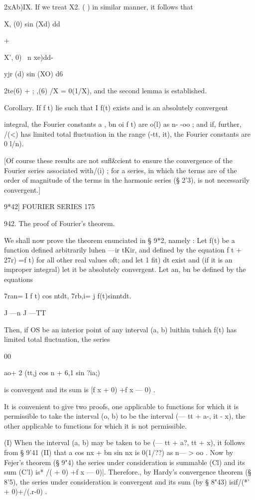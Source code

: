  2xAb)IX. If we treat X2. ( ) in similar manner, it follows that



X, (0) sin (Xd) dd



+



X', 0) \ n xe)dd-



yjr (d) sin (XO) d6

 2te(6) + ; ,(6) /X = 0(1/X), and the second lemma is established.

Corollary. If f t) lie such that I f(t) exists and is an absolutely
convergent

integral, the Fourier constants a , bn oi f t) are o(l) as n- -oo ;
and if, further, /(<) has limited total fluctuation in the range (-tt,
it), the Fourier constants are 0 l/n).

[Of course these results are not sufl\&cient to ensure the convergence
of the Fourier series associated with/(i) ; for a series, in which the
terms are of the order of magnitude of the terms in the harmonic
series (§ 2'3), is not necessarily convergent.]



9*42] FOURIER SERIES 175

942. The proof of Fourier's theorem.

We shall now prove the theorem enunciated in § 9*2, namely : Let f(t)
be a function defined arbitrarily luhen —ir tKir, and defined by the
equation f t + 27r) =f t) for all other real values oft; and let 1
fit) dt exist and (if it is an improper integral) let it be absolutely
convergent. Let an, bn be defined by the equations

7ran= I f t) cos ntdt, 7rb,i= j f(t)sinntdt.

J —n J —TT

Then, if OS be an interior point of any interval (a, b) luithin tuhich
f(t) has limited total fluctuation, the series

00

 ao+ 2 (tt,j cos n + 6,1 sin ?ia;)

is convergent and its sum is [f x + 0) +f x — 0) .

It is convenient to give two proofs, one applicable to functions for
which it is permissible to take the interval (o, b) to be the interval
(— tt + a-, it - x), the other applicable to functions for which it is
not permissible.

(I) When the interval (a, b) may be taken to be (— tt + a?, tt + x),
it follows from § 9'41 (II) that a cos nx + bn sin nx is 0(1/??) as n—
> oo . Now by Fejer's theorem (§ 9"4) the series under consideration
is summable (Cl) and its sum (C'l) is* /( + 0) +f x — 0)|. Therefore.,
by Hardy's convergence theorem (§ 8'5), the series under consideration
is convergent and its sum (by § 8"43) isif/(*' + 0)+/(.r-0) .

